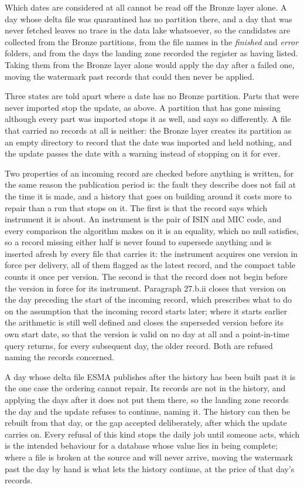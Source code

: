 Which dates are considered at all cannot be read off the Bronze layer alone. A day whose delta file was quarantined has no partition there, and a day that was never fetched leaves no trace in the data lake whatsoever, so the candidates are collected from the Bronze partitions, from the file names in the \emph{finished} and \emph{error} folders, and from the days the landing zone recorded the register as having listed. Taking them from the Bronze layer alone would apply the day after a failed one, moving the watermark past records that could then never be applied.

Three states are told apart where a date has no Bronze partition. Parts that were never imported stop the update, as above. A partition that has gone missing although every part was imported stops it as well, and says so differently. A file that carried no records at all is neither: the Bronze layer creates its partition as an empty directory to record that the date was imported and held nothing, and the update passes the date with a warning instead of stopping on it for ever.

Two properties of an incoming record are checked before anything is written, for the same reason the publication period is: the fault they describe does not fail at the time it is made, and a history that goes on building around it costs more to repair than a run that stops on it. The first is that the record says which instrument it is about. An instrument is the pair of ISIN and MIC code, and every comparison the algorithm makes on it is an equality, which no null satisfies, so a record missing either half is never found to supersede anything and is inserted afresh by every file that carries it: the instrument acquires one version in force per delivery, all of them flagged as the latest record, and the compact table counts it once per version. The second is that the record does not begin before the version in force for its instrument. Paragraph 27.b.ii closes that version on the day preceding the start of the incoming record, which prescribes what to do on the assumption that the incoming record starts later; where it starts earlier the arithmetic is still well defined and closes the superseded version before its own start date, so that the version is valid on no day at all and a point-in-time query returns, for every subsequent day, the older record. Both are refused naming the records concerned.

A day whose delta file ESMA publishes after the history has been built past it is the one case the ordering cannot repair. Its records are not in the history, and applying the days after it does not put them there, so the landing zone records the day and the update refuses to continue, naming it. The history can then be rebuilt from that day, or the gap accepted deliberately, after which the update carries on. Every refusal of this kind stops the daily job until someone acts, which is the intended behaviour for a database whose value lies in being complete; where a file is broken at the source and will never arrive, moving the watermark past the day by hand is what lets the history continue, at the price of that day's records.

